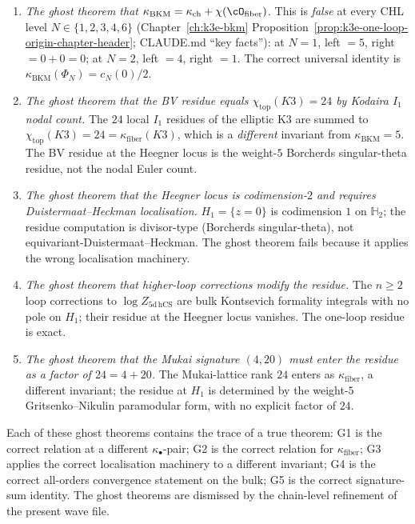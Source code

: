 \begin{enumerate}[label=\textbf{G\arabic*.}]
\item \emph{The ghost theorem that $\kappa_{\mathrm{BKM}} =
\kappa_{\mathrm{ch}} + \chi(\cO_{\mathrm{fiber}})$.} This is \emph{false}
at every CHL level $N \in \{1, 2, 3, 4, 6\}$ (Chapter~\ref{ch:k3e-bkm}
Proposition~\ref{prop:k3e-one-loop-origin-chapter-header}; CLAUDE.md
``key facts''): at $N = 1$, left $= 5$, right $= 0 + 0 = 0$; at $N = 2$,
left $= 4$, right $= 1$. The correct universal identity is
$\kappa_{\mathrm{BKM}}(\Phi_N) = c_N(0)/2$.
\item \emph{The ghost theorem that the BV residue equals
$\chi_{\mathrm{top}}(K3) = 24$ by Kodaira $I_1$ nodal count.} The
$24$ local $I_1$ residues of the elliptic K3 are summed to
$\chi_{\mathrm{top}}(K3) = 24 = \kappa_{\mathrm{fiber}}(K3)$, which is
a \emph{different} invariant from $\kappa_{\mathrm{BKM}} = 5$. The BV
residue at the Heegner locus is the weight-$5$ Borcherds singular-theta
residue, not the nodal Euler count.
\item \emph{The ghost theorem that the Heegner locus is codimension-$2$
and requires Duistermaat--Heckman localisation.} $H_1 = \{z = 0\}$ is
codimension $1$ on $\mathbb{H}_2$; the residue computation is
divisor-type (Borcherds singular-theta), not equivariant-Duistermaat--Heckman.
The ghost theorem fails because it applies the wrong localisation
machinery.
\item \emph{The ghost theorem that higher-loop corrections modify the
residue.} The $n \geq 2$ loop corrections to $\log Z_{5\mathrm{d\,hCS}}$
are bulk Kontsevich formality integrals with no pole on $H_1$; their
residue at the Heegner locus vanishes. The one-loop residue is exact.
\item \emph{The ghost theorem that the Mukai signature $(4, 20)$ must
enter the residue as a factor of $24 = 4 + 20$.} The Mukai-lattice
rank $24$ enters as $\kappa_{\mathrm{fiber}}$, a different invariant;
the residue at $H_1$ is determined by the weight-$5$ Gritsenko--Nikulin
paramodular form, with no explicit factor of $24$.
\end{enumerate}

Each of these ghost theorems contains the trace of a true theorem:
G1 is the correct relation at a different $\kappa_\bullet$-pair;
G2 is the correct relation for $\kappa_{\mathrm{fiber}}$; G3 applies
the correct localisation machinery to a different invariant;
G4 is the correct all-orders convergence statement on the bulk;
G5 is the correct signature-sum identity. The ghost theorems are
dismissed by the chain-level refinement of the present wave file.

